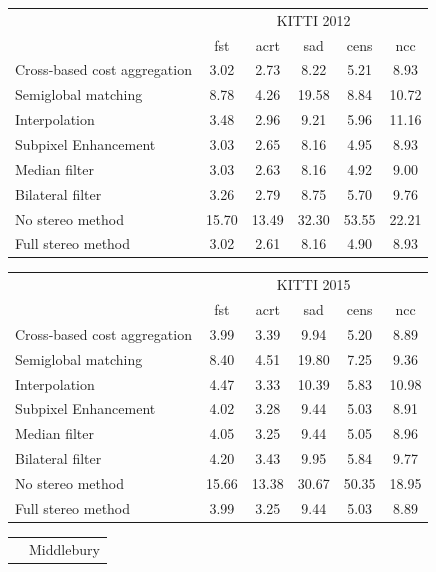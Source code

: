 \documentclass[twoside,11pt]{article}
\begin{document}
\begin{table}[p]
\begin{center}
\begin{tabular}{lccccc}\toprule
& \multicolumn{5}{c}{KITTI 2012} \\
\cmidrule(lr){2-6}
& fst & acrt & sad & cens & ncc \\\midrule
Cross-based cost aggregation & 3.02 & 2.73 & 8.22 & 5.21 & 8.93 \\
Semiglobal matching          & 8.78 & 4.26 & 19.58 & 8.84 & 10.72 \\
Interpolation                & 3.48 & 2.96 & 9.21 & 5.96 & 11.16 \\
Subpixel Enhancement         & 3.03 & 2.65 & 8.16 & 4.95 & 8.93 \\
Median filter                & 3.03 & 2.63 & 8.16 & 4.92 & 9.00 \\
Bilateral filter             & 3.26 & 2.79 & 8.75 & 5.70 & 9.76 \\\midrule
No stereo method             & 15.70 & 13.49 & 32.30 & 53.55 & 22.21 \\
Full stereo method           & 3.02 & 2.61 & 8.16 & 4.90 & 8.93 \\
\end{tabular}
\begin{tabular}{l ccccc}\toprule
& \multicolumn{5}{c}{KITTI 2015} \\
\cmidrule(lr){2-6}
& fst & acrt & sad & cens & ncc \\\midrule
Cross-based cost aggregation & 3.99 & 3.39 & 9.94 & 5.20 & 8.89 \\
Semiglobal matching          & 8.40 & 4.51 & 19.80 & 7.25 & 9.36 \\
Interpolation                & 4.47 & 3.33 & 10.39 & 5.83 & 10.98 \\
Subpixel Enhancement         & 4.02 & 3.28 & 9.44 & 5.03 & 8.91 \\
Median filter                & 4.05 & 3.25 & 9.44 & 5.05 & 8.96 \\
Bilateral filter             & 4.20 & 3.43 & 9.95 & 5.84 & 9.77 \\\midrule
No stereo method             & 15.66 & 13.38 & 30.67 & 50.35 & 18.95 \\
Full stereo method           & 3.99 & 3.25 & 9.44 & 5.03 & 8.89 \\
\end{tabular}
\begin{tabular}{l ccccc}\toprule
& \multicolumn{5}{c}{Middlebury} \\

\end{tabular}
\end{center}
\end{table}
\end{document}
